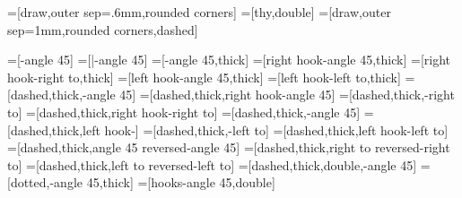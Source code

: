%
%

\usetikzlibrary{arrows}
\newcommand{\@mmtarrowtip}{angle 45}
\newcommand{\@mmtreversearrowtip}{angle 45 reversed}
\newcommand{\@mmtarrowtipepi}{triangle 45}
\newcommand{\@mmtarrowtipmonoright}{right hook}
\newcommand{\@mmtarrowtipmonoleft}{left hook}
\newcommand{\@mmtarrowtippartial}{right to}
\newcommand{\@mmtarrowtippartialleft}{left to}
\newcommand{\@mmtreversearrowtippartial}{right to reversed}
\newcommand{\@mmtreversearrowtippartialleft}{left to reversed}

%
=[draw,outer sep=.6mm,rounded corners]
=[thy,double]
=[draw,outer sep=1mm,rounded corners,dashed]

=[-\@mmtarrowtip] 
=[|-\@mmtarrowtip] %
=[-\@mmtarrowtip,thick]
=[\@mmtarrowtipmonoright-\@mmtarrowtip,thick]
=[\@mmtarrowtipmonoright-\@mmtarrowtippartial,thick]
=[\@mmtarrowtipmonoleft-\@mmtarrowtip,thick]
=[\@mmtarrowtipmonoleft-\@mmtarrowtippartialleft,thick]
=[dashed,thick,-\@mmtarrowtip]
=[dashed,thick,\@mmtarrowtipmonoright-\@mmtarrowtip]
=[dashed,thick,-\@mmtarrowtippartial]
=[dashed,thick,\@mmtarrowtipmonoright-\@mmtarrowtippartial]
=[dashed,thick,-\@mmtarrowtip]
=[dashed,thick,\@mmtarrowtipmonoleft-\@mmtarrowtipleft]
=[dashed,thick,-\@mmtarrowtippartialleft]
=[dashed,thick,\@mmtarrowtipmonoleft-\@mmtarrowtippartialleft]
=[dashed,thick,\@mmtreversearrowtip-\@mmtarrowtip]
=[dashed,thick,\@mmtreversearrowtippartial-\@mmtarrowtippartial]
=[dashed,thick,\@mmtreversearrowtippartialleft-\@mmtarrowtippartialleft]
=[dashed,thick,double,-\@mmtarrowtip]
=[dotted,-\@mmtarrowtip,thick]
=[hooks-\@mmtarrowtip,double] 

